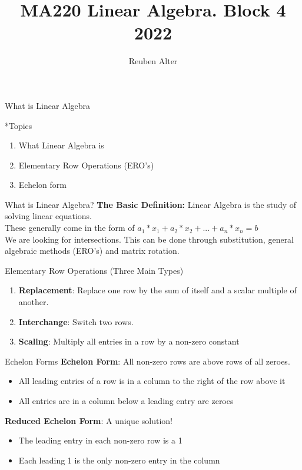 \documentclass[a4paper, 12pt]{article}
\title{MA220 Linear Algebra. Block 4 2022}
\author{Reuben Alter}
\date{}
\begin{document}
\maketitle
\newpage
\tableofcontents

\newpage

\begin{section}{What is Linear Algebra}
\begin{subsection}*{Topics}
\begin{enumerate}
		\item{What Linear Algebra is}
		\item{Elementary Row Operations (ERO's)}
		\item{Echelon form}
\end{enumerate}
\end{subsection}
\begin{subsection}{What is Linear Algebra?}
\textbf{The Basic Definition:} Linear Algebra is the study of 
solving linear equations.\\ These generally come in the form of
$a_1*x_1+a_2*x_2+...+a_n*x_n=b$\\ We are looking for intersections.
This can be done through substitution, general algebraic methods 
(ERO's) and matrix rotation. \\
\end{subsection}
\begin{subsection}{Elementary Row Operations (Three Main Types)}
\begin{enumerate}
	\item{\textbf{Replacement}: Replace one row by the 
		sum of itself and a scalar multiple of another.}
	\item{\textbf{Interchange}: Switch two rows.}
	\item{\textbf{Scaling}: Multiply all entries in a row by
		a non-zero constant}
\end{enumerate}
\end{subsection}
\begin{subsection}{Echelon Forms}
	\textbf{Echelon Form}: All non-zero rows are above rows
	of all zeroes.
	\begin{itemize}
	\item{All leading entries of a row is in a column to 
		the right of the row above it}
	\item{All entries are in a column below a leading entry
		are zeroes}
\end{itemize}
\textbf{Reduced Echelon Form}: A unique solution!
\begin{itemize}
\item{The leading entry in each non-zero row is a 1}
\item{Each leading 1 is the only non-zero entry in the column}
\end{itemize}
\end{subsection}


\end{section}
\end{document}

